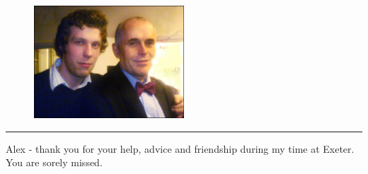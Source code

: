 \documentclass[10pt, a4paper]{report}
\begin{document}


\pagestyle{fancy}










 


\newpage \vspace*{5cm}
\begin{figure}[h]
\begin{center}
\includegraphics[width=0.5\textwidth]{figures/alex.jpg}
\end{center}
\end{figure}
\hrule

\begin{center}
Alex - thank you for your help, advice and friendship during my time at Exeter. You are sorely missed.
\end{center}
\end{document}

